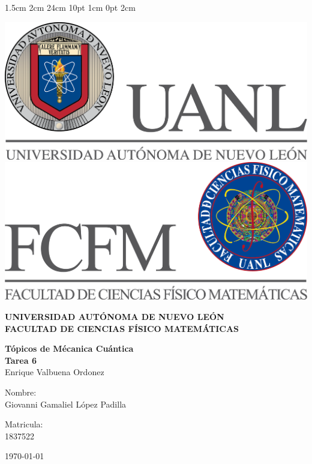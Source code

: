 \documentclass[12pt,letterpaper]{report}
\begin{document}
\setmargins{2.5cm}      
{1.5cm}                     
{2cm}  
{24cm}                    
{10pt}                          
{1cm}                          
{0pt}                             
{2cm}
\begin{titlepage}
\begin{center}
\includegraphics[scale=0.40]{../../Logos/uanl.png} 
\hspace{2.5cm}
\includegraphics[scale=0.40]{../../Logos/fcfm.png}
\end{center}
\vspace{2cm}
\begin{center}
\textbf{
UNIVERSIDAD AUTÓNOMA DE NUEVO LEÓN\\
FACULTAD DE CIENCIAS
    FÍSICO MATEMÁTICAS}\\
\vspace*{2cm}
\begin{large}
\vspace{1cm}
\large{\textbf{Tópicos de Mécanica Cuántica}}\\
\textbf{Tarea 6}\\
Enrique Valbuena Ordonez\\
\end{large}
\vspace{3.5cm}
\begin{minipage}{0.6\linewidth}
\vspace{0.5cm}
\changefontsizes{14pt}
Nombre:\\
Giovanni Gamaliel López Padilla\\
\end{minipage}
\begin{minipage}{0.2\linewidth}
\changefontsizes{14pt}
Matricula:\\
1837522
\end{minipage}
\end{center}
\vspace{4cm}
\begin{flushright}
\today
\end{flushright}
\end{titlepage}
\end{document}
